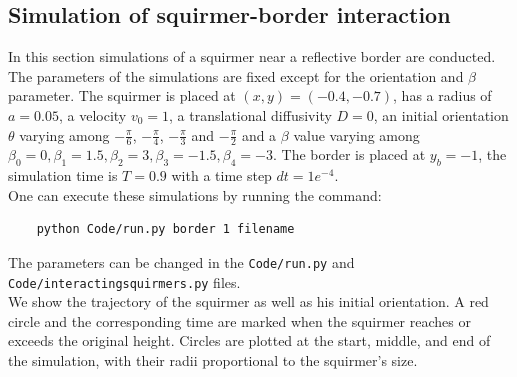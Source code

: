 \documentclass{article}
\begin{document}
\subsection{Simulation of squirmer-border interaction}
In this section simulations of a squirmer near a reflective border are conducted. The parameters of the simulations are fixed
except for the orientation and $\beta$ parameter. The squirmer is placed at $(x,y) = (-0.4,-0.7)$, has a radius of $a=0.05$,
a velocity $v_0=1$, a translational diffusivity $D=0$, an initial orientation $\theta$ varying among $-\frac{\pi}{6}$, $-\frac{\pi}{4}$, $-\frac{\pi}{3}$
and $-\frac{\pi}{2}$ and a $\beta$ value varying among $\beta_0 = 0, \beta_1 = 1.5, \beta_2 = 3, \beta_3 = -1.5, \beta_4 = -3$.
The border is placed at $y_b = -1$, the simulation time is $T = 0.9$ with a time step $dt = 1e^{-4}$.\\
One can execute these simulations by running the command:
 \begin{verbatim}
    python Code/run.py border 1 filename
 \end{verbatim}
 The parameters can be changed in the \texttt{Code/run.py} and \\
 \texttt{Code/interactingsquirmers.py} files.\\
 We show the trajectory of the squirmer as well as his initial orientation. A red circle and the corresponding time are marked when the squirmer
 reaches or exceeds the original height. Circles are plotted at the start, 
 middle, and end of the simulation, with their radii proportional to the squirmer's size.
\end{document}
